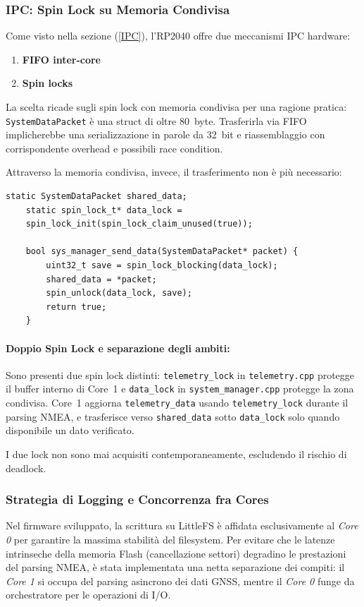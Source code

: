 \subsubsection*{IPC: Spin Lock su Memoria Condivisa}

Come visto nella sezione (\ref{IPC}), l'RP2040 offre due meccanismi IPC hardware: 
\begin{enumerate}
	\item[-]  \textbf{FIFO inter-core}
	
	\item[-] \textbf{Spin locks}
\end{enumerate}

La scelta ricade sugli spin lock con memoria condivisa per una ragione pratica: \texttt{SystemDataPacket} è una struct di oltre 80~byte. Trasferirla via FIFO implicherebbe una  serializzazione in parole da 32~bit e riassemblaggio con corrispondente overhead e possibili race condition. 

Attraverso la memoria condivisa, invece, il trasferimento non è più necessario:

\begin{lstlisting}[caption={system\_manager.cpp --- accesso bloccante alla struct condivisa}]
	static SystemDataPacket shared_data;
	static spin_lock_t* data_lock =
	spin_lock_init(spin_lock_claim_unused(true));
	
	bool sys_manager_send_data(SystemDataPacket* packet) {
		uint32_t save = spin_lock_blocking(data_lock);
		shared_data = *packet;
		spin_unlock(data_lock, save);
		return true;
	}
\end{lstlisting}


\paragraph{Doppio Spin Lock e separazione degli ambiti:}

Sono presenti due spin lock distinti: \texttt{telemetry\_lock} in
\texttt{telemetry.cpp} protegge il buffer interno di Core~1 e
\texttt{data\_lock} in \texttt{system\_manager.cpp} protegge la zona condivisa. Core~1 aggiorna \texttt{telemetry\_data} usando
\texttt{telemetry\_lock} durante il parsing NMEA, e trasferisce verso \texttt{shared\_data} sotto \texttt{data\_lock} solo quando disponibile un dato verificato. 

I due lock non sono mai acquisiti contemporaneamente, escludendo il rischio di deadlock.

\subsubsection*{Strategia di Logging e Concorrenza fra Cores}
Nel firmware sviluppato, la scrittura su LittleFS è affidata esclusivamente al \textit{Core 0} per garantire la massima stabilità del filesystem. Per evitare che le latenze intrinseche della memoria Flash (cancellazione settori) degradino le prestazioni del parsing NMEA, è stata implementata una netta separazione dei compiti: il \textit{Core 1} si occupa del parsing asincrono dei dati GNSS, mentre il \textit{Core 0} funge da orchestratore per le operazioni di I/O.


